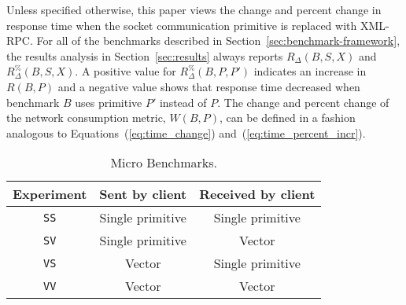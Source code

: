 \documentclass{sig-alternate}
\begin{document}
\begin{sloppypar}
Unless specified otherwise, this paper views the change and percent
change in response time when the socket communication primitive is
replaced with XML-RPC.  For all of the benchmarks described in
Section~\ref{sec:benchmark-framework}, the results analysis in
Section~\ref{sec:results} always reports $R_\Delta(B,S,X)$ and {\small
  $R_\Delta^\%(B,S,X)$}.  A positive value for {\small
  $R_\Delta^\%(B,P,P')$} indicates an increase in $R(B,P)$ and a
negative value shows that response time decreased when benchmark $B$
uses primitive $P'$ instead of $P$.  The change and percent change of
the network consumption metric, $W(B,P)$, can be defined in a fashion
analogous to Equations~(\ref{eq:time_change})
and~(\ref{eq:time_percent_incr}).
\end{sloppypar}





\begin{table}[t]

  \begin{center}
  \begin{tabular}{| c | c | c |}
  \hline
  Experiment & Sent by client & Received by client \\
  \hline
  \texttt{SS} & Single primitive & Single primitive \\
  \texttt{SV} & Single primitive & Vector \\
  \texttt{VS} & Vector & Single primitive \\
  \texttt{VV} & Vector & Vector \\
  \hline
  \end{tabular}
\end{center}

  \vspace*{-.1in}
  \caption{Micro Benchmarks.}\label{tab:baselines}

\end{table}
\end{document}
